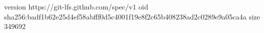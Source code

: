 version https://git-lfs.github.com/spec/v1
oid sha256:badf1b62e25d4ef58abfff0d5c4001f19e8f2c65b408238ad2c0289e9a05ca4a
size 349692
